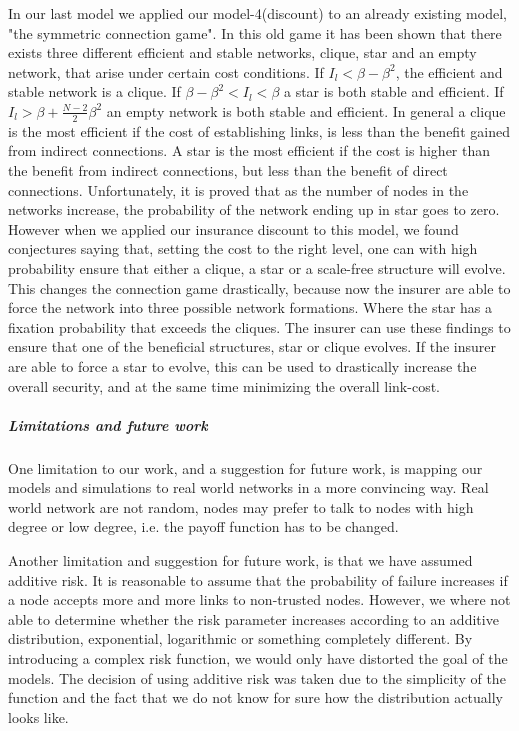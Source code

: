 In our last model we applied our model-4(discount) to an already existing model, "the symmetric connection game". In this old game it has been shown that there exists three different efficient and stable networks, clique, star and an empty network, that arise under certain cost conditions. If $I_{l}<\beta-\beta^{2}$, the efficient and stable network is a clique. If $\beta-\beta^{2}<I_{l}<\beta$ a star is both stable and efficient. If $I_{l}>\beta+\frac{N-2}{2}\beta^{2}$ an empty network is both stable and efficient. In general a clique is the most efficient if the cost of establishing links, is less than the benefit gained from indirect connections. A star is the most efficient if the cost is higher than the benefit from indirect connections, but less than the benefit of direct connections. 
Unfortunately, it is proved that as the number of nodes in the networks increase, the probability of the network ending up in star goes to zero. However when we applied our insurance discount to this model, we found conjectures saying that, setting the cost to the right level, one can with high probability ensure that either a clique, a star or a scale-free structure will evolve. This changes the connection game drastically, because now the insurer are able to force the network into three possible network formations. Where the star has a fixation probability that exceeds the cliques. The insurer can use these findings to ensure that one of the beneficial structures, star or clique evolves. If the insurer are able to force a star to evolve, this can be used to drastically increase the overall security, and at the same time minimizing the overall link-cost. 

\subparagraph{Limitations and future work}
One limitation to our work, and a suggestion for future work, is mapping our models and simulations to real world networks in a more convincing way. Real world network are not random, nodes may prefer to talk to nodes with high degree or low degree, i.e. the payoff function has to be changed. 

Another limitation and suggestion for future work, is that we have assumed additive risk. It is reasonable to assume that the probability of failure increases if a node accepts more and more links to non-trusted nodes. However, we where not able to determine whether the risk parameter increases according to an additive distribution, exponential, logarithmic or something completely different. By introducing a complex risk function, we would only have distorted the goal of the models. The decision of using additive risk was taken due to the simplicity of the function and the fact that we do not know for sure how the distribution actually looks like.

